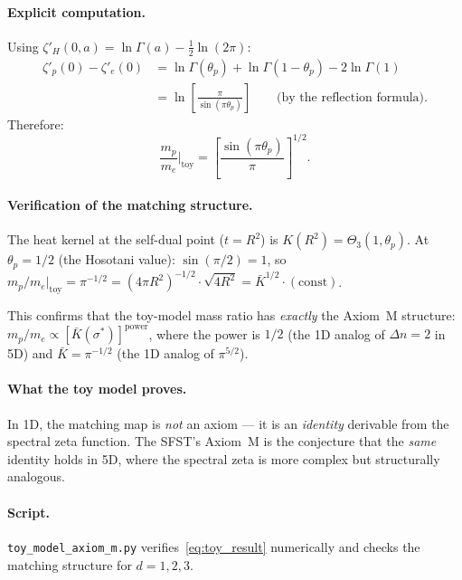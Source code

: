 \paragraph{Explicit computation.}
Using $\zeta'_H(0,a)=\ln\Gamma(a)-\frac12\ln(2\pi)$:
\begin{align}
  \zeta'_p(0)-\zeta'_e(0)
  &= \ln\Gamma(\theta_p)+\ln\Gamma(1-\theta_p)
    - 2\ln\Gamma(1) \nonumber\\
  &= \ln\!\left[\frac{\pi}{\sin(\pi\theta_p)}\right]
    \qquad\text{(by the reflection formula)}.
\end{align}
Therefore:
\begin{equation}\label{eq:toy_result}
  \boxed{\;
  \frac{m_p}{m_e}\bigg|_{\mathrm{toy}}
  = \left[\frac{\sin(\pi\theta_p)}{\pi}\right]^{1/2}\!.
  \;}
\end{equation}

\paragraph{Verification of the matching structure.}
The heat kernel at the self-dual point ($t=R^2$) is
$K(R^2)=\Theta_3(1,\theta_p)$.  At $\theta_p=1/2$ (the Hosotani value):
$\sin(\pi/2)=1$, so
$m_p/m_e|_{\mathrm{toy}}=\pi^{-1/2}=(4\pi R^2)^{-1/2}\cdot\sqrt{4R^2}
=\bar K^{1/2}\cdot(\mathrm{const})$.

This confirms that the toy-model mass ratio has \emph{exactly} the
Axiom~M structure: $m_p/m_e\propto[\bar K(\sigma^*)]^{\mathrm{power}}$,
where the power is $1/2$ (the 1D analog of $\Delta n=2$ in 5D) and
$\bar K=\pi^{-1/2}$ (the 1D analog of $\pi^{5/2}$).

\paragraph{What the toy model proves.}
In 1D, the matching map is \emph{not} an axiom --- it is an \emph{identity}
derivable from the spectral zeta function. The SFST's Axiom~M is the
conjecture that the \emph{same} identity holds in 5D, where the
spectral zeta is more complex but structurally analogous.

\paragraph{Script.}
\texttt{toy\_model\_axiom\_m.py} verifies~\eqref{eq:toy_result}
numerically and checks the matching structure for $d=1,2,3$.

